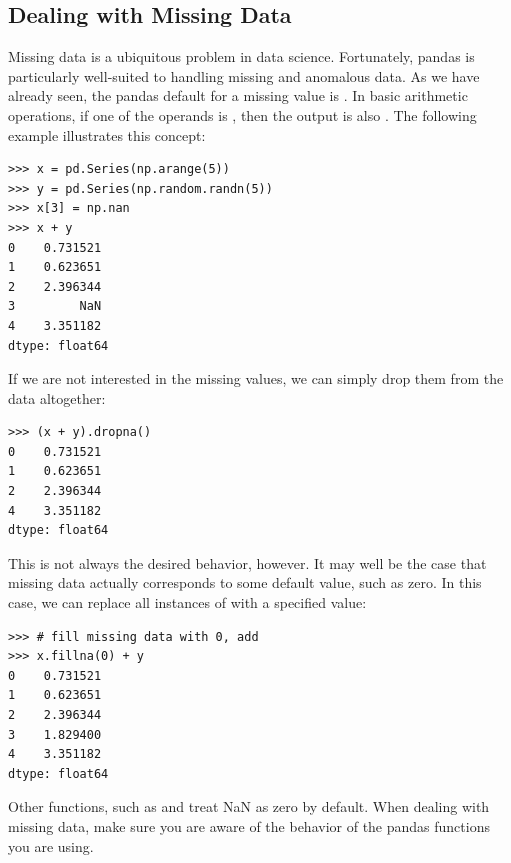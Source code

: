 \subsection*{Dealing with Missing Data}
Missing data is a ubiquitous problem in data science. Fortunately, pandas is particularly well-suited to 
handling missing and anomalous data. As we have already seen, the pandas default for a missing value is . 
In basic arithmetic operations, if one of the operands is , then the output is also .
The following example illustrates this concept:
\begin{lstlisting}
>>> x = pd.Series(np.arange(5))
>>> y = pd.Series(np.random.randn(5))
>>> x[3] = np.nan
>>> x + y
0    0.731521
1    0.623651
2    2.396344
3         NaN
4    3.351182
dtype: float64
\end{lstlisting}
If we are not interested in the missing values, we can simply drop them from the data altogether:
\begin{lstlisting}
>>> (x + y).dropna()
0    0.731521
1    0.623651
2    2.396344
4    3.351182
dtype: float64
\end{lstlisting}

This is not always the desired behavior, however. It may well be the case that missing data actually corresponds to
some default value, such as zero. In this case, we can replace all instances of  with a specified value:
\begin{lstlisting}
>>> # fill missing data with 0, add
>>> x.fillna(0) + y
0    0.731521
1    0.623651
2    2.396344
3    1.829400
4    3.351182
dtype: float64
\end{lstlisting}

Other functions, such as  and  treat NaN as zero by default.
When dealing with missing data, make sure you are aware of the behavior of the pandas
functions you are using.

